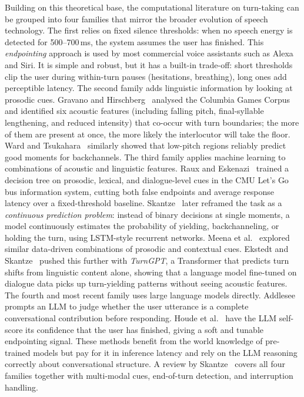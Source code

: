 Building on this theoretical base, the computational literature on turn-taking can be grouped into four families that mirror the broader evolution of speech technology. The first relies on fixed silence thresholds: when no speech energy is detected for 500--700\,ms, the system assumes the user has finished. This \emph{endpointing} approach is used by most commercial voice assistants such as Alexa and Siri. It is simple and robust, but it has a built-in trade-off: short thresholds clip the user during within-turn pauses (hesitations, breathing), long ones add perceptible latency. The second family adds linguistic information by looking at prosodic cues. Gravano and Hirschberg~\cite{gravano2011turncues} analysed the Columbia Games Corpus and identified six acoustic features (including falling pitch, final-syllable lengthening, and reduced intensity) that co-occur with turn boundaries; the more of them are present at once, the more likely the interlocutor will take the floor. Ward and Tsukahara~\cite{ward2000backchannel} similarly showed that low-pitch regions reliably predict good moments for backchannels. The third family applies machine learning to combinations of acoustic and linguistic features. Raux and Eskenazi~\cite{raux2009endpointing} trained a decision tree on prosodic, lexical, and dialogue-level cues in the CMU Let's Go bus information system, cutting both false endpoints and average response latency over a fixed-threshold baseline. Skantze~\cite{skantze2017turntaking} later reframed the task as a \emph{continuous prediction problem}: instead of binary decisions at single moments, a model continuously estimates the probability of yielding, backchanneling, or holding the turn, using LSTM-style recurrent networks. Meena et al.~\cite{meena2014turntaking} explored similar data-driven combinations of prosodic and contextual cues. Ekstedt and Skantze~\cite{ekstedt2020turngpt} pushed this further with \emph{TurnGPT}, a Transformer that predicts turn shifts from linguistic content alone, showing that a language model fine-tuned on dialogue data picks up turn-yielding patterns without seeing acoustic features. The fourth and most recent family uses large language models directly. Addlesee~\cite{addlesee2024ari} prompts an LLM to judge whether the user utterance is a complete conversational contribution before responding. Houde et al.~\cite{houde2025koala} have the LLM self-score its confidence that the user has finished, giving a soft and tunable endpointing signal. These methods benefit from the world knowledge of pre-trained models but pay for it in inference latency and rely on the LLM reasoning correctly about conversational structure. A review by Skantze~\cite{skantze2021review} covers all four families together with multi-modal cues, end-of-turn detection, and interruption handling.

